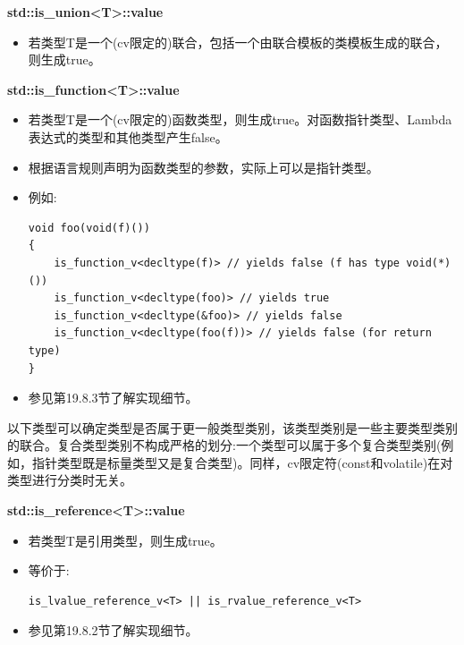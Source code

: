 \textbf{std::is\_union<T>::value}

\begin{itemize}
\item 
若类型T是一个(cv限定的)联合，包括一个由联合模板的类模板生成的联合，则生成true。
\end{itemize}

\textbf{std::is\_function<T>::value}

\begin{itemize}
\item 
若类型T是一个(cv限定的)函数类型，则生成true。对函数指针类型、Lambda表达式的类型和其他类型产生false。

\item 
根据语言规则声明为函数类型的参数，实际上可以是指针类型。

\item 
例如:
\begin{lstlisting}[style=styleCXX]
void foo(void(f)())
{
	is_function_v<decltype(f)> // yields false (f has type void(*)())
	is_function_v<decltype(foo)> // yields true
	is_function_v<decltype(&foo)> // yields false
	is_function_v<decltype(foo(f))> // yields false (for return type)
}
\end{lstlisting}

\item 
参见第19.8.3节了解实现细节。
\end{itemize}


以下类型可以确定类型是否属于更一般类型类别，该类型类别是一些主要类型类别的联合。复合类型类别不构成严格的划分:一个类型可以属于多个复合类型类别(例如，指针类型既是标量类型又是复合类型)。同样，cv限定符(const和volatile)在对类型进行分类时无关。

\textbf{std::is\_reference<T>::value}

\begin{itemize}
\item 
若类型T是引用类型，则生成true。

\item 
等价于: 
\begin{lstlisting}[style=styleCXX]
is_lvalue_reference_v<T> || is_rvalue_reference_v<T>
\end{lstlisting}

\item 
参见第19.8.2节了解实现细节。
\end{itemize}


